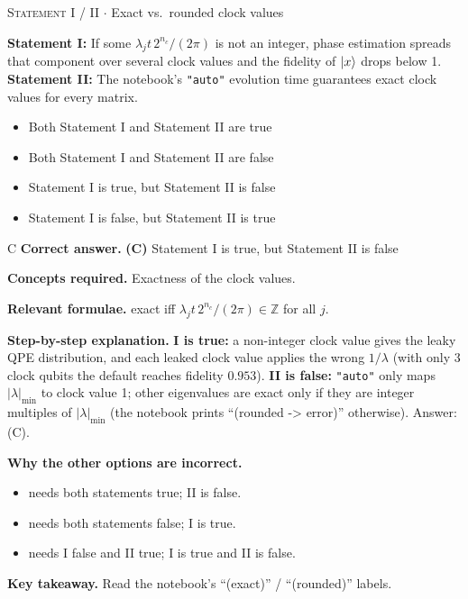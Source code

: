 \documentclass[11pt,a4paper]{article}
\newcommand{\optlabel}[1]{\textbf{(#1)}}
\newcommand{\correctlabel}[1]{\textcolor{okgreen}{\textbf{(#1)}\,\ding{51}}}
\newenvironment{qitem}[1]{\begin{list}{}{\setlength{\leftmargin}{3.3em}\setlength{\labelwidth}{3.1em}%
  \setlength{\labelsep}{0.2em}\setlength{\topsep}{3pt}\setlength{\parsep}{3pt}}\item[\textbf{Q.#1}\hfill]}{\end{list}}
\newcommand{\qsep}{\par\vspace{2pt}{\color{black!15}\hrule}\vspace{4pt}}
\newcommand{\qmeta}[2]{{\footnotesize\color{black!60}\textsc{#1} \;$\cdot$\; #2}\par}
\begin{document}
\begin{qitem}{52}
\qmeta{Statement I / II}{Exact vs.\ rounded clock values}
\textbf{Statement I:} If some $\lambda_jt\,2^{n_c}/(2\pi)$ is not an integer, phase estimation spreads that component over several clock values and the fidelity of $\ket x$ drops below 1.\\[1mm]
\textbf{Statement II:} The notebook's \texttt{"auto"} evolution time guarantees exact clock values for every matrix.
\begin{itemize}[leftmargin=2.6em, labelsep=0.4em, itemsep=2pt, topsep=3pt]
\item[\optlabel{A}] Both Statement I and Statement II are true
\item[\optlabel{B}] Both Statement I and Statement II are false
\item[\correctlabel{C}] Statement I is true, but Statement II is false
\item[\optlabel{D}] Statement I is false, but Statement II is true
\end{itemize}
\end{qitem}
\begin{solbox}{C}
\textbf{\color{brand}Correct answer.} \textcolor{okgreen}{\textbf{(C)}} Statement I is true, but Statement II is false

\textbf{\color{brand}Concepts required.} Exactness of the clock values.

\textbf{\color{brand}Relevant formulae.} exact iff $\lambda_jt\,2^{n_c}/(2\pi) \in \mathbb Z$ for all $j$.

\textbf{\color{brand}Step-by-step explanation.} \textbf{I is true:} a non-integer clock value gives the leaky QPE distribution, and each leaked clock value applies the wrong $1/\lambda$ (with only 3 clock qubits the default reaches fidelity $0.953$).
\textbf{II is false:} \texttt{"auto"} only maps $|\lambda|_{\min}$ to clock value 1; other eigenvalues are exact only if they are integer multiples of $|\lambda|_{\min}$ (the notebook prints ``(rounded -> error)''
otherwise). Answer: (C).

\textbf{\color{brand}Why the other options are incorrect.}
\begin{itemize}[leftmargin=2.4em, itemsep=1pt, topsep=2pt]
\item[\textbf{(A)}] needs both statements true; II is false.
\item[\textbf{(B)}] needs both statements false; I is true.
\item[\textbf{(D)}] needs I false and II true; I is true and II is false.
\end{itemize}
\textbf{\color{brand}Key takeaway.} Read the notebook's ``(exact)'' / ``(rounded)'' labels.
\end{solbox}
\qsep
\end{document}
